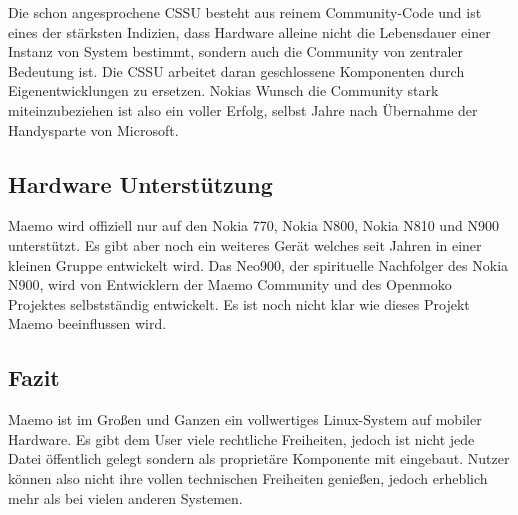 Die schon angesprochene CSSU besteht aus reinem Community-Code und ist eines der stärksten Indizien, dass Hardware alleine nicht die Lebensdauer einer Instanz von System bestimmt, sondern auch die Community von zentraler Bedeutung ist. Die CSSU arbeitet daran geschlossene Komponenten durch Eigenentwicklungen zu ersetzen. Nokias Wunsch die Community stark miteinzubeziehen ist also ein voller Erfolg, selbst Jahre nach Übernahme der Handysparte von Microsoft\thinspace\cite{online:nokia-microsoft}.
\newline

\subsection{Hardware Unterstützung}
Maemo wird offiziell nur auf den Nokia 770\thinspace\cite{online:maemo1-770}, Nokia N800\thinspace\cite{online:n800-specs}, Nokia N810\thinspace\cite{online:n810-specs} und N900\thinspace\cite{online:n900-specs} unterstützt. Es gibt aber noch ein weiteres Gerät welches seit Jahren in einer kleinen Gruppe entwickelt wird. Das Neo900, der spirituelle Nachfolger des Nokia N900\thinspace\cite{online:maemo-neo900}, wird von Entwicklern der Maemo Community und des Openmoko Projektes selbstständig entwickelt\thinspace\cite{online:maemo-neo900team}. Es ist noch nicht klar wie dieses Projekt Maemo beeinflussen wird.
\newline

\subsection{Fazit}
Maemo ist im Großen und Ganzen ein vollwertiges Linux-System auf mobiler Hardware. Es gibt dem User viele rechtliche Freiheiten, jedoch ist nicht jede Datei öffentlich gelegt sondern als proprietäre Komponente mit eingebaut. Nutzer können also nicht ihre vollen technischen Freiheiten genießen, jedoch erheblich mehr als bei vielen anderen Systemen.